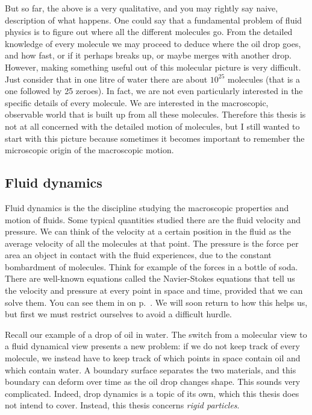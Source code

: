 \documentclass[thesis.tex]{subfiles}
\begin{document}
But so far, the above is a very qualitative, and you may rightly say naive, description of what happens. One could say that a fundamental problem of fluid physics is to figure out where all the different molecules go. From the detailed knowledge of every molecule we may proceed to deduce where the oil drop goes, and how fast, or if it perhaps breaks up, or maybe merges with another drop. However, making something useful out of this molecular picture is very difficult.
Just consider that in one litre of water there are about $10^{25}$ molecules (that is a one followed by 25 zeroes). In fact, we are not even particularly interested in the specific details of every molecule. We are interested in the macroscopic, observable world that is built up from all these molecules. Therefore this thesis is not at all concerned with the detailed motion of molecules, but I still wanted to start with this picture because sometimes it becomes important to remember the microscopic origin of the macroscopic motion.


\subsection*{Fluid dynamics}

Fluid dynamics is the the discipline studying the macroscopic properties and motion of fluids. Some typical quantities studied there are the fluid velocity and pressure. We can think of the velocity at a certain position in the fluid as the average velocity of all the molecules at that point. The pressure is the force per area an object in contact with the fluid experiences, due to the constant bombardment of molecules. Think for example of the forces in a bottle of soda. There are well-known equations called the Navier-Stokes equations that tell us the velocity and pressure at every point in space and time, provided that we can solve them. You can see them in  on p.~\pageref{eqn:nsintro}. We will soon return to how this helps us, but first we must restrict ourselves to avoid a difficult hurdle.

Recall our example of a drop of oil in water. The switch from a molecular view to a fluid dynamical view presents a new problem: if we do not keep track of every molecule, we instead have to keep track of which points in space contain oil and which contain water. A boundary surface separates the two materials, and this boundary can deform over time as the oil drop changes shape. This sounds very complicated. Indeed, drop dynamics is a topic of its own, which this thesis does not intend to cover. Instead, this thesis concerns \emph{rigid particles}.
\end{document}
